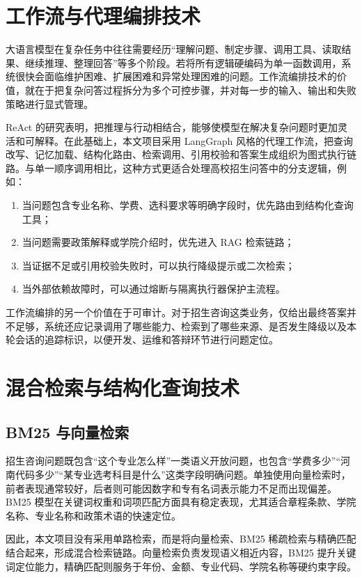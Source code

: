 \documentclass[UTF8,zihao=-4,oneside,fontset=windows]{ctexbook}
\numberwithin{equation}{chapter}
\begin{document}
\section{工作流与代理编排技术}
大语言模型在复杂任务中往往需要经历“理解问题、制定步骤、调用工具、读取结果、继续推理、整理回答”等多个阶段。若将所有逻辑硬编码为单一函数调用，系统很快会面临维护困难、扩展困难和异常处理困难的问题。工作流编排技术的价值，就在于把复杂问答过程拆分为多个可控步骤，并对每一步的输入、输出和失败策略进行显式管理。

ReAct 的研究表明，把推理与行动相结合，能够使模型在解决复杂问题时更加灵活和可解释\cite{react2023}。在此基础上，本文项目采用 LangGraph 风格的代理工作流，把查询改写、记忆加载、结构化路由、检索调用、引用校验和答案生成组织为图式执行链路。与单一顺序调用相比，这种方式更适合处理高校招生问答中的分支逻辑，例如：

\begin{enumerate}
  \item 当问题包含专业名称、学费、选科要求等明确字段时，优先路由到结构化查询工具；
  \item 当问题需要政策解释或学院介绍时，优先进入 RAG 检索链路；
  \item 当证据不足或引用校验失败时，可以执行降级提示或二次检索；
  \item 当外部依赖故障时，可以通过熔断与隔离执行器保护主流程。
\end{enumerate}

工作流编排的另一个价值在于可审计。对于招生咨询这类业务，仅给出最终答案并不足够，系统还应记录调用了哪些能力、检索到了哪些来源、是否发生降级以及本轮会话的追踪标识，以便开发、运维和答辩环节进行问题定位。

\section{混合检索与结构化查询技术}
\subsection{BM25 与向量检索}
招生咨询问题既包含“这个专业怎么样”一类语义开放问题，也包含“学费多少”“河南代码多少”“某专业选考科目是什么”这类字段明确问题。单独使用向量检索时，前者表现通常较好，后者则可能因数字和专有名词表示能力不足而出现偏差。BM25 模型在关键词权重和词项匹配方面具有稳定表现\cite{robertson2009bm25}，尤其适合章程条款、学院名称、专业名称和政策术语的快速定位。

因此，本文项目没有采用单路检索，而是将向量检索、BM25 稀疏检索与精确匹配结合起来，形成混合检索链路。向量检索负责发现语义相近内容，BM25 提升关键词定位能力，精确匹配则服务于年份、金额、专业代码、学院名称等硬约束字段。
\end{document}
